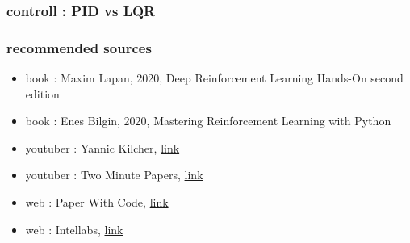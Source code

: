 \documentclass{beamer}
\begin{document}
\begin{frame}
\begin{columns}
    \end{columns}

\end{frame}



\begin{frame}
  
  \frametitle{controll : PID vs LQR}    


\end{frame}


\begin{frame}
  
  \frametitle{recommended sources}

  \begin{itemize}
    \item book : Maxim Lapan, 2020, Deep Reinforcement Learning Hands-On second edition
    \item book : Enes Bilgin, 2020, Mastering Reinforcement Learning with Python
    \item youtuber : Yannic Kilcher, \href{https://www.youtube.com/c/YannicKilcher/videos}{link}
    \item youtuber : Two Minute Papers, \href{https://www.youtube.com/c/KárolyZsolnai/videos}{link}
    \item web : Paper With Code, \href{https://paperswithcode.com/methods/category/policy-gradient-methods}{link}
    \item web : Intellabs, \href{https://intellabs.github.io/coach/components/agents/index.html}{link}
  \end{itemize}
    
\end{frame}
\end{document}
